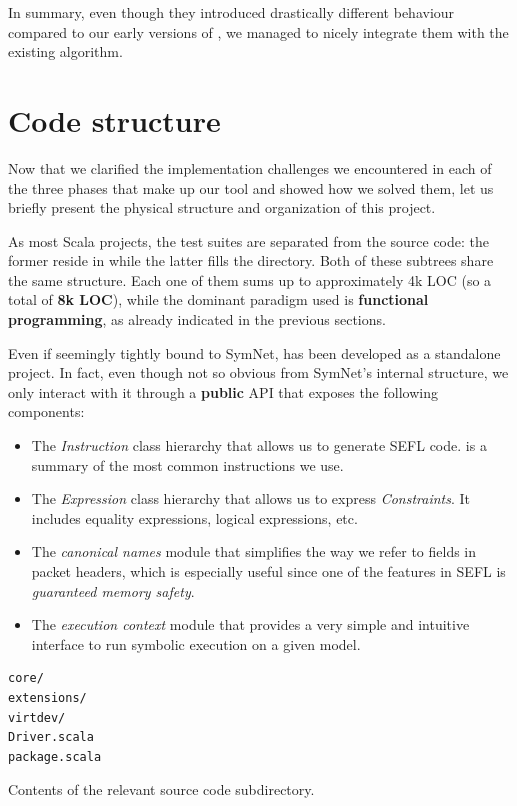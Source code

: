{In summary, even though they introduced drastically different behaviour
compared to our early versions of \TOOL, we managed to nicely integrate them
with the existing algorithm.


\section{Code structure}

Now that we clarified the implementation challenges we encountered in each of
the three phases that make up our tool and showed how we solved them, let us
briefly present the physical structure and organization of this project.

As most Scala projects, the test suites are separated from the source code: the
former reside in  while the latter fills the 
directory.  Both of these subtrees share the same structure.  Each one of them
sums up to approximately 4k LOC (so a total of \textbf{8k LOC}), while the
dominant paradigm used is \textbf{functional programming}, as already indicated
in the previous sections.

Even if seemingly tightly bound to SymNet, \TOOL has been developed as a
standalone project.  In fact, even though not so obvious from SymNet's internal
structure, we only interact with it through a \textbf{public}
API that exposes the following
components:
\begin{itemize}
  \item The \emph{Instruction} class hierarchy that allows us to generate SEFL
    code.   is a summary of the most
    common instructions we use.
  \item The \emph{Expression} class hierarchy that allows us to express
    \emph{Constraints}.  It includes equality expressions, logical expressions,
    etc.
  \item The \emph{canonical names} module that simplifies the way we refer to
    fields in packet headers, which is especially useful since one of the
    features in SEFL is \emph{guaranteed memory safety}.
  \item The \emph{execution context} module that provides a very simple and
    intuitive interface to run symbolic execution on a given model.
\end{itemize}

\begin{listing}
  \lstset{numbers=none, frame=single, basicstyle=\ttfamily,
    xleftmargin=0.30\textwidth, xrightmargin=0.30\textwidth
  }
  \begin{lstlisting}
core/
extensions/
virtdev/
Driver.scala
package.scala
  \end{lstlisting}
  \caption{Contents of the relevant source code subdirectory.}
  \label{lst:root-directory}
\end{listing}

}
